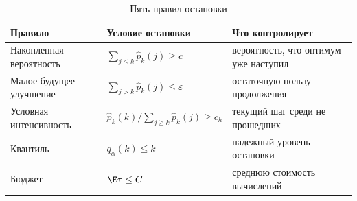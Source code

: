 \begin{table}[H]
\centering
\caption{Пять правил остановки}
\label{tab:stopping_rules}
\begin{tabularx}{\textwidth}{lYY}
\toprule
Правило & Условие остановки & Что контролирует \\
\midrule
Накопленная вероятность & \(\sum_{j\le k}\widehat p_k(j)\ge c\) & вероятность, что оптимум уже наступил \\
Малое будущее улучшение & \(\sum_{j>k}\widehat p_k(j)\le\varepsilon\) & остаточную пользу продолжения \\
Условная интенсивность & \(\widehat p_k(k)/\sum_{j\ge k}\widehat p_k(j)\ge c_h\) & текущий шаг среди не прошедших \\
Квантиль & \(q_\alpha(k)\le k\) & надежный уровень остановки \\
Бюджет & \(\E\tau\le C\) & среднюю стоимость вычислений \\
\bottomrule
\end{tabularx}
\end{table}

